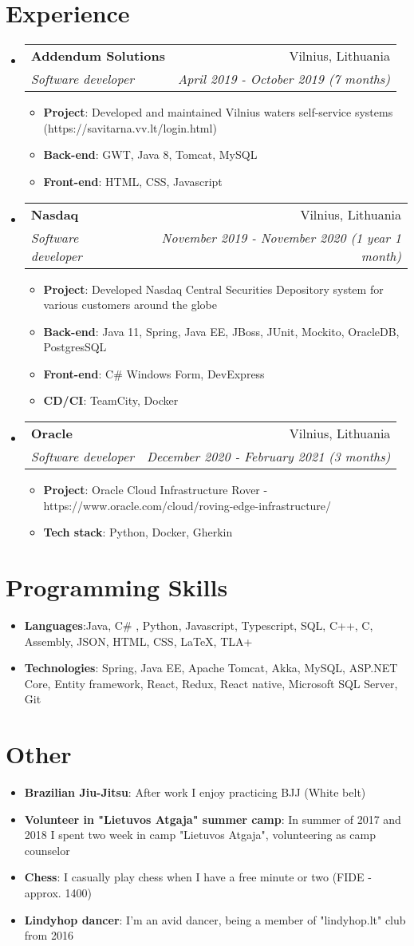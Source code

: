 \documentclass[letterpaper,11pt]{article}
\makeatletter
\newcommand{\resumeItem}[2]{
  \item\small{
    \textbf{#1}{: #2 \vspace{-2pt}}
  }
}
\newcommand{\resumeSubheading}[4]{
  \vspace{-1pt}\item
    \begin{tabular*}{0.97\textwidth}[t]{l@{\extracolsep{\fill}}r}
      \textbf{#1} & #2 \\
      \textit{\small#3} & \textit{\small #4} \\
    \end{tabular*}\vspace{-5pt}
}
\newcommand{\resumeSubItem}[2]{\resumeItem{#1}{#2}\vspace{-4pt}}
\newcommand{\resumeSubHeadingListStart}{\begin{itemize}[leftmargin=*]}
\newcommand{\resumeSubHeadingListEnd}{\end{itemize}}
\newcommand{\resumeItemListStart}{\begin{itemize}}
\newcommand{\resumeItemListEnd}{\end{itemize}\vspace{-5pt}}
\makeatother
\begin{document}
\section{Experience}
  \resumeSubHeadingListStart
    \resumeSubheading
      {Addendum Solutions}{Vilnius, Lithuania}
      {Software developer}{April 2019 - October 2019 (7 months)}
      \resumeItemListStart
        \resumeItem{Project}
          {Developed and maintained  Vilnius waters self-service systems (https://savitarna.vv.lt/login.html)}
        \resumeItem{Back-end}
          {GWT, Java 8, Tomcat, MySQL}
        \resumeItem{Front-end}
	{HTML, CSS, Javascript}
      \resumeItemListEnd
    \resumeSubheading
      {Nasdaq}{Vilnius, Lithuania}
      {Software developer}{November 2019 - November 2020 (1 year 1 month)}
      \resumeItemListStart
	 \resumeItem{Project}
	          {Developed Nasdaq Central Securities Depository system for various customers around the globe}
	 \resumeItem{Back-end}
	          {Java 11, Spring, Java EE, JBoss, JUnit, Mockito, OracleDB, PostgresSQL}
	 \resumeItem{Front-end}
	          {C\# Windows Form, DevExpress}
	 \resumeItem{CD/CI}
	          {TeamCity, Docker}
      \resumeItemListEnd
    \resumeSubheading
      {Oracle}{Vilnius, Lithuania}
      {Software developer}{December 2020 - February 2021 (3 months)}
      \resumeItemListStart
	 \resumeItem{Project}
	          {Oracle Cloud Infrastructure Rover - https://www.oracle.com/cloud/roving-edge-infrastructure/}
      \resumeItem{Tech stack}
	          {Python, Docker, Gherkin}
      \resumeItemListEnd
  \resumeSubHeadingListEnd
\section{Programming Skills}
  \resumeSubHeadingListStart
    \item{
      \textbf{Languages}{:Java, C\# , Python, Javascript, Typescript, SQL, C++, C, Assembly, JSON, HTML, CSS, LaTeX, TLA+}
      \hfill
    }
    \item{
	\textbf{Technologies}{: Spring, Java EE, Apache Tomcat, Akka, MySQL, ASP.NET Core, Entity framework, React, Redux, React native,  Microsoft SQL Server, Git}
	\hfil
	}
  \resumeSubHeadingListEnd
\section{Other}
  \resumeSubHeadingListStart
    \resumeSubItem{Brazilian Jiu-Jitsu}
      {After work I enjoy practicing BJJ (White belt)}
    \resumeSubItem{Volunteer in "Lietuvos Atgaja" summer camp}
      {In summer of 2017 and 2018 I spent two week in camp "Lietuvos Atgaja", volunteering as camp counselor}
    \resumeSubItem{Chess}
      {I casually play chess when I have a free minute or two (FIDE - approx. 1400)}
    \resumeSubItem{Lindyhop dancer}
      {I'm an avid dancer, being a member of "lindyhop.lt" club from 2016 }
  \resumeSubHeadingListEnd
\end{document}
